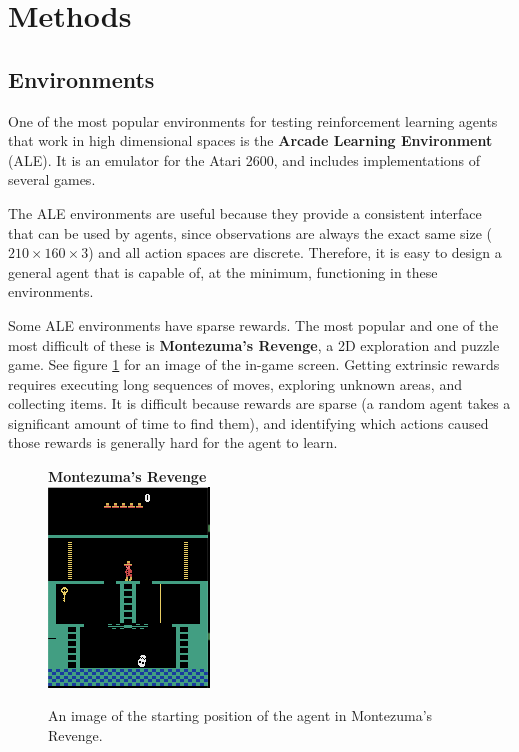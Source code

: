 \documentclass[journal, onecolumn, 12pt, draftclsnofoot]{IEEEtran}
\newcommand{\kword}[1]{\textbf{#1}}
\begin{document}
	\newpage
	\section{Methods}
	\label{sec:methods}
	\subsection{Environments}
	\par One of the most popular environments for testing reinforcement learning agents that work in high dimensional spaces is the \kword{Arcade Learning Environment} (ALE). It is an emulator for the Atari 2600, and includes implementations of several games.
	\par The ALE environments are useful because they provide a consistent interface that can be used by agents, since observations are always the exact same size ($210 \times 160 \times 3$) and all action spaces are discrete. Therefore, it is easy to design a general agent that is capable of, at the minimum, functioning in these environments.
	\par Some ALE environments have sparse rewards. The most popular and one of the most difficult of these is \kword{Montezuma's Revenge}, a 2D exploration and puzzle game. See figure \ref{fig:mr} for an image of the in-game screen. Getting extrinsic rewards requires executing long sequences of moves, exploring unknown areas, and collecting items. It is difficult because rewards are sparse (a random agent takes a significant amount of time to find them), and identifying which actions caused those rewards is generally hard for the agent to learn.
	\begin{figure}
		\begin{center}
			\textbf{Montezuma's Revenge} \\
		\includegraphics{fig/mr.png}
	\end{center}
		\caption{An image of the starting position of the agent in Montezuma's Revenge.}
		\label{fig:mr}
	\end{figure}
\end{document}
